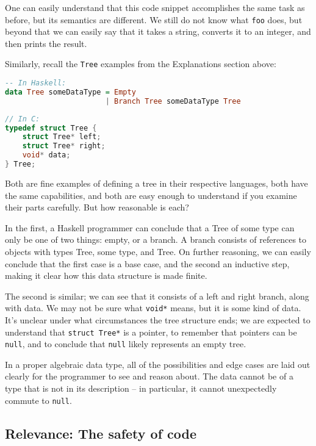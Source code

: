 \documentclass[12pt,a4paper]{article}
\begin{document}
		One can easily understand that this code snippet accomplishes the same task as before, but its semantics are different. We still do not know what \texttt{foo} does, but beyond that we can easily say that it takes a string, converts it to an integer, and then prints the result.
		
		Similarly, recall the \texttt{Tree} examples from the Explanations section above:
		\begin{lstlisting}[language=Haskell]
-- In Haskell:
data Tree someDataType = Empty
                       | Branch Tree someDataType Tree
		\end{lstlisting}
		\begin{lstlisting}[language=C]
// In C:
typedef struct Tree {
	struct Tree* left;
	struct Tree* right;
	void* data;
} Tree;
		\end{lstlisting}
		
		Both are fine examples of defining a tree in their respective languages, both have the same capabilities, and both are easy enough to understand if you examine their parts carefully. But how reasonable is each?
		
		In the first, a Haskell programmer can conclude that a Tree of some type can only be one of two things: empty, or a branch. A branch consists of references to objects with types Tree, some type, and Tree. On further reasoning, we can easily conclude that the first case is a base case, and the second an inductive step, making it clear how this data structure is made finite.
		
		The second is similar; we can see that it consists of a left and right branch, along with data. We may not be sure what \texttt{void*} means, but it is some kind of data. It's unclear under what circumstances the tree structure ends; we are expected to understand that \texttt{struct Tree*} is a pointer, to remember that pointers can be \texttt{null}, and to conclude that \texttt{null} likely represents an empty tree.
		
		In a proper algebraic data type, all of the possibilities and edge cases are laid out clearly for the programmer to see and reason about. The data cannot be of a type that is not in its description -- in particular, it cannot unexpectedly commute to \texttt{null}.
		
		\pagebreak
		\subsection{Relevance: The safety of code}
		
\end{document}
